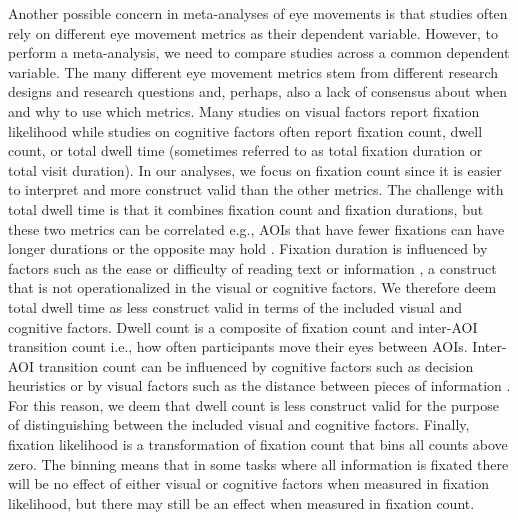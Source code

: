 Another possible concern in meta-analyses of eye movements is that studies often rely on different eye movement metrics as their dependent variable. However, to perform a meta-analysis, we need to compare studies across a common dependent variable. The many different eye movement metrics stem from different research designs and research questions and, perhaps, also a lack of consensus about when and why to use which metrics. Many studies on visual factors report fixation likelihood while studies on cognitive factors often report fixation count, dwell count, or total dwell time (sometimes referred to as total fixation duration or total visit duration). In our analyses, we focus on fixation count since it is easier to interpret and more construct valid than the other metrics. The challenge with total dwell time is that it combines fixation count and fixation durations, but these two metrics can be correlated e.g., AOIs that have fewer fixations can have longer durations or the opposite may hold \citep{orquin2018a}. Fixation duration is influenced by factors such as the ease or difficulty of reading text or information \citep{rayner2009}, a construct that is not operationalized in the visual or cognitive factors. We therefore deem total dwell time as less construct valid in terms of the included visual and cognitive factors. Dwell count is a composite of fixation count and inter-AOI transition count i.e., how often participants move their eyes between AOIs. Inter-AOI transition count can be influenced by cognitive factors such as decision heuristics \citep{schoemann2019} or by visual factors such as the distance between pieces of information \citep{perkovic2018}. For this reason, we deem that dwell count is less construct valid for the purpose of distinguishing between the included visual and cognitive factors. Finally, fixation likelihood is a transformation of fixation count that bins all counts above zero. The binning means that in some tasks where all information is fixated there will be no effect of either visual or cognitive factors when measured in fixation likelihood, but there may still be an effect when measured in fixation count. \\

